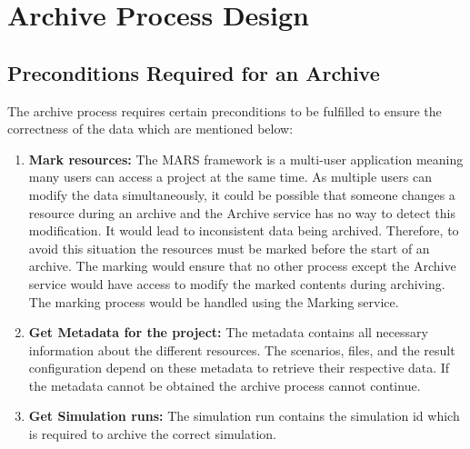 \section{Archive Process Design}
\subsection{Preconditions Required for an Archive}
The archive process requires certain preconditions to be fulfilled to ensure the correctness of the data which are mentioned below:
\begin{enumerate}
    \label{lst:preconditionsArchive}
    \item \textbf{Mark resources:} The MARS framework is a multi-user application meaning many users can access a project at the same time. 
    As multiple users can modify the data simultaneously, it could be possible that someone changes a resource during an archive and the 
    Archive service has no way to detect this modification. It would lead to inconsistent data being archived.
    Therefore, to avoid this situation the resources must be marked before the start of an archive. The marking would ensure that no other process except the Archive
    service would have access to modify the marked contents during archiving. The marking process would be handled using the Marking service.
    \item \textbf{Get Metadata for the project:} The metadata contains all necessary information about
    the different resources. The scenarios, files, and the result configuration depend on these metadata
    to retrieve their respective data. If the metadata cannot be obtained the archive process cannot continue.
    \item \textbf{Get Simulation runs:} The simulation run contains the simulation id which is required to archive the correct simulation.
\end{enumerate}


